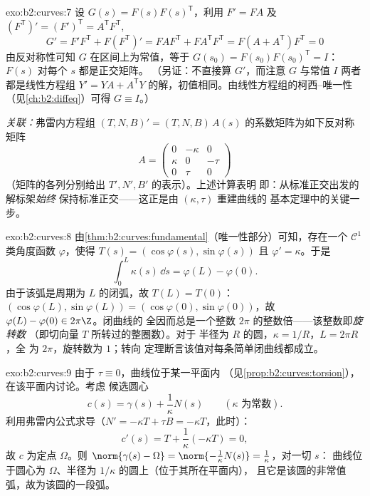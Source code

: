 \begin{solution}{exo:b2:curves:7}
设 $G(s) = F(s)F(s)^{\mathsf T}$，利用 $F' = FA$ 及
$(F^{\mathsf T})' = (F')^{\mathsf T} = A^{\mathsf T}F^{\mathsf T}$,
\[
G' = F'F^{\mathsf T} + F(F^{\mathsf T})'
= FAF^{\mathsf T} + FA^{\mathsf T}F^{\mathsf T}
= F(A + A^{\mathsf T})F^{\mathsf T} = 0
\]
由反对称性可知 $G$ 在区间上为常值，等于
$G(s_0) = F(s_0)F(s_0)^{\mathsf T} = I$：$F(s)$ 对每个 $s$ 都是正交矩阵。
（另证：不直接算 $G'$，而注意 $G$ 与常值 $I$ 两者
都是线性方程组 $Y' = YA +
A^{\mathsf T}Y$ 的解，初值相同。由线性方程组的柯西–唯一性
（见\cref{ch:b2:diffeq}）可得 $G
\equiv I$。）

\emph{关联：}弗雷内方程组 $(T, N, B)' = (T, N, B)\,A(s)$
的系数矩阵为如下反对称矩阵
\[
A = \begin{pmatrix} 0 & -\kappa & 0\\ \kappa & 0 & -\tau\\
0 & \tau & 0\end{pmatrix}
\]
（矩阵的各列分别给出 $T', N', B'$ 的表示）。上述计算表明
即：从标准正交出发的解标架\emph{始终}
保持标准正交——这正是由 $(\kappa, \tau)$ 重建曲线的
基本定理中的关键一步。
\end{solution}

\begin{solution}{exo:b2:curves:8}
由\cref{thm:b2:curves:fundamental}（唯一性部分）可知，存在一个
$\mathcal{C}^1$ 类角度函数 $\varphi$，使得 $T(s) =
(\cos\varphi(s), \sin\varphi(s))$ 且 $\varphi' = \kappa$。于是
\[
\int_0^L \kappa(s)\,\dd s = \varphi(L) - \varphi(0) .
\]
由于该弧是周期为 $L$ 的闭弧，故 $T(L) = T(0)$：
$(\cos\varphi(L), \sin\varphi(L)) = (\cos\varphi(0),
\sin\varphi(0))$，故 $\varphi(L) - \varphi(0) \in 2\pi\Z$。闭曲线的
全因而总是一个整数
$2\pi$ 的整数倍——该整数即\emph{旋转数}
（即切向量 $T$ 所转过的整圈数）。对于
半径为 $R$ 的圆，$\kappa = 1/R$，$L = 2\pi R$，全
为 $2\pi$，旋转数为 $1$；转向
定理断言该值对每条简单闭曲线都成立。
\end{solution}

\begin{solution}{exo:b2:curves:9}
由于 $\tau \equiv 0$，曲线位于某一平面内
（见\cref{prop:b2:curves:torsion}），在该平面内讨论。考虑
候选圆心
\[
c(s) = \gamma(s) + \frac{1}{\kappa}N(s)
\qquad (\kappa \text{ 为常数}).
\]
利用弗雷内公式求导（$N' = -\kappa T + \tau B
= -\kappa T$，此时）：
\[
c'(s) = T + \frac1\kappa(-\kappa T) = 0 ,
\]
故 $c$ 为定点 $\Omega$。则 $\norm{\gamma(s) -
\Omega} = \norm{-\frac1\kappa N(s)} = \frac1\kappa$，对一切 $s$：
曲线位于圆心为 $\Omega$、半径为
$1/\kappa$ 的圆上（位于其所在平面内），
且它是该圆的非常值弧，故为该圆的一段弧。
\end{solution}

